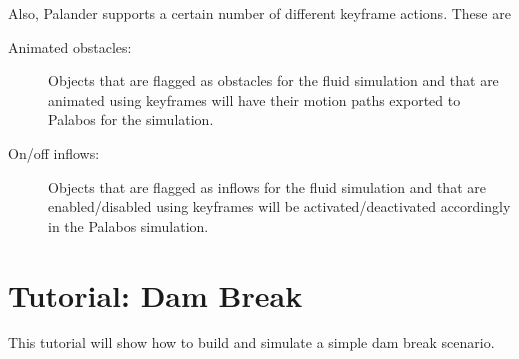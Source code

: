 \documentclass[12pt]{article}
\begin{document}
Also, Palander supports a certain number of different keyframe actions. These are
\begin{description}
\item[Animated obstacles:] Objects that are flagged as obstacles for the fluid simulation and that are 
animated using keyframes will have their motion paths exported to Palabos for the simulation.
\item[On/off inflows:] Objects that are flagged as inflows for the fluid simulation and that are 
enabled/disabled using keyframes will be activated/deactivated accordingly in the Palabos simulation.
\end{description}

\newpage

\section{Tutorial: Dam Break}

This tutorial will show how to build and simulate a simple dam break scenario.
\end{document}
